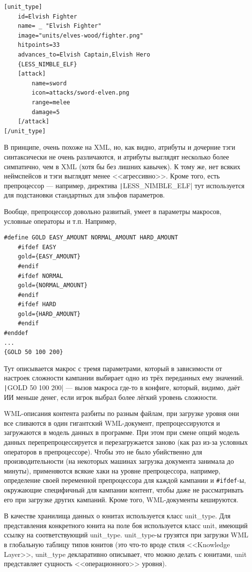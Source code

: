 \documentclass[a5paper]{article}
\begin{document}
\begin{verbatim}
[unit_type]
    id=Elvish Fighter
    name= _ "Elvish Fighter"
    image="units/elves-wood/fighter.png"
    hitpoints=33
    advances_to=Elvish Captain,Elvish Hero
    {LESS_NIMBLE_ELF}
    [attack]
        name=sword
        icon=attacks/sword-elven.png
        range=melee
        damage=5
    [/attack]
[/unit_type]
\end{verbatim}

В принципе, очень похоже на XML, но, как видно, атрибуты и дочерние тэги синтаксически не очень различаются, и атрибуты выглядят несколько более симпатично, чем в XML (хотя бы без лишних кавычек). К тому же, нет всяких неймспейсов и тэги выглядят менее <<агрессивно>>. Кроме того, есть препроцессор --- например, директива \texttt|{LESS_NIMBLE_ELF}| тут используется для подстановки стандартных для эльфов параметров.

Вообще, препроцессор довольно развитый, умеет в параметры макросов, условные операторы и т.п. Например,

\begin{verbatim}
#define GOLD EASY_AMOUNT NORMAL_AMOUNT HARD_AMOUNT
    #ifdef EASY
    gold={EASY_AMOUNT}
    #endif
    #ifdef NORMAL
    gold={NORMAL_AMOUNT}
    #endif
    #ifdef HARD
    gold={HARD_AMOUNT}
    #endif
#enddef
...
{GOLD 50 100 200}
\end{verbatim}

Тут описывается макрос с тремя параметрами, который в зависимости от настроек сложности кампании выбирает одно из трёх переданных ему значений. \texttt|{GOLD 50 100 200}| --- вызов макроса где-то в конфиге, который, видимо, даёт ИИ меньше денег, если игрок выбрал более лёгкий уровень сложности.

WML-описания контента разбиты по разным файлам, при загрузке уровня они все сливаются в один гигантский WML-документ, препроцессируются и загружаются в модель данных в программе. При этом при смене опций модель данных перепрепроцессируется и перезагружается заново (как раз из-за условных операторов в препроцессоре). Чтобы это не было убийственно для производительности (на некоторых машинах загрузка документа занимала до минуты), применяются всякие хаки на уровне препроцессора, например, определение своей переменной препроцессора для каждой кампании и \texttt{#ifdef}-ы, окружающие специфичный для кампании контент, чтобы даже не рассматривать его при загрузке других кампаний. Кроме того, WML-документы кешируются.

В качестве хранилища данных о юнитах используется класс unit\_type. Для представления конкретного юнита на поле боя используется класс unit, имеющий ссылку на соответствующий unit\_type. unit\_type-ы грузятся при загрузки WML в глобальную таблицу типов юнитов (это что-то вроде стиля <<Knowledge Layer>>, unit\_type декларативно описывает, что можно делать с юнитами, unit представляет сущность <<операционного>> уровня). 
\end{document}
